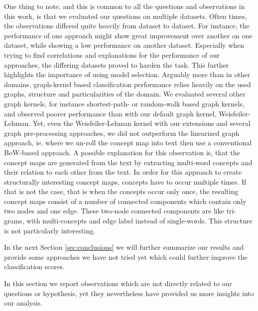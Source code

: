 One thing to note, and this is common to all the questions and observations in this work, is that we evaluated our questions on multiple datasets. Often times, the observations differed quite heavily from dataset to dataset.
For instance, the performance of one approach might show great improvement over another on one dataset, while showing a low performance on another dataset. 
Especially when trying to find correlations and explanations for the performance of our approaches, the differing datasets proved to harden the task.
This further highlights the importance of using model selection.
Arguably more than in other domains,  graph-kernel based classification performance relies heavily on the used graphs, structure and particularities of the domain.
We evaluated several other graph kernels, for instance shortest-path- or random-walk based graph kernels, and observed poorer performance than with our default graph kernel, Weisfeiler-Lehman.
Yet, even the Weisfeiler-Lehman kernel with our extensions and several graph pre-processing approaches, we did not outperform the linearized graph approach, ie. where we un-roll the concept map into text then use a conventional BoW-based approach.
A possible explanation for this observation is, that the concept maps are generated from the text by extracting multi-word concepts and their relation to each other from the text.
In order for this approach to create structurally interesting concept maps, concepts have to occur multiple times.
If that is not the case, that is when the concepts occur only once, the resulting concept maps consist of a number of connected components which contain only two nodes and one edge.
These two-node connected components are like tri-grams, with multi-concepts and edge label instead of single-words.
This structure is not particularly interesting.

In the next Section \ref{sec:conclusions} we will further summarize our results and provide some approaches we have not tried yet which could further improve the classification scores.


In this section we report observations which are not directly related to our questions or hypothesis, yet they nevertheless have provided us more insights into our analysis.

